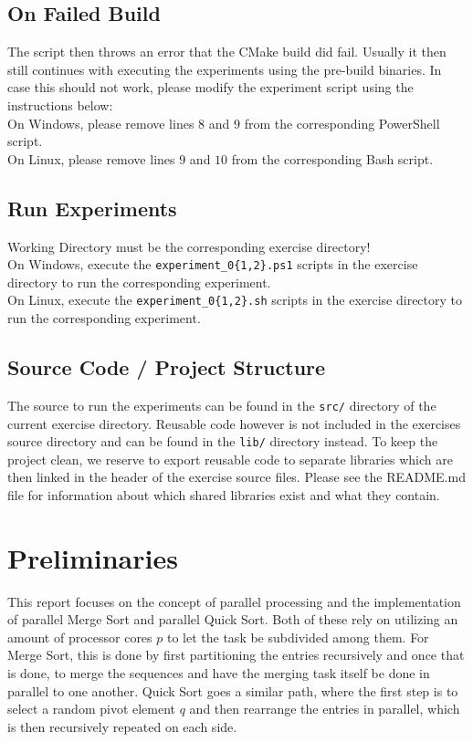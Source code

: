 \documentclass[twocolumn]{article}
\begin{document}
\subsection{On Failed Build}
The script then throws an error that the CMake build did fail.
Usually it then still continues with executing the experiments using the pre-build binaries.
In case this should not work, please modify the experiment script using the instructions below:\\
On Windows, please remove lines $8$ and $9$ from the corresponding PowerShell script.\\
On Linux, please remove lines $9$ and $10$ from the corresponding Bash script.

\subsection{Run Experiments}
Working Directory must be the corresponding exercise directory!\\
On Windows, execute the \texttt{experiment\_0\{1,2\}.ps1} scripts in the exercise directory to run the corresponding experiment.\\
On Linux, execute the \texttt{experiment\_0\{1,2\}.sh} scripts in the exercise directory to run the corresponding experiment.\\

\subsection{Source Code / Project Structure}
The source to run the experiments can be found in the \texttt{src/} directory of the current exercise directory. 
Reusable code however is not included in the exercises source directory and can be found in the \texttt{lib/} directory instead. 
To keep the project clean, we reserve to export reusable code to separate libraries which are then linked in the header of the exercise source files. 
Please see the README.md file for information about which shared libraries exist and what they contain.

\section{Preliminaries}
This report focuses on the concept of parallel processing and the implementation of parallel Merge Sort and parallel Quick Sort. Both of these rely on utilizing an amount of processor cores $p$ to let the task be subdivided among them.
For Merge Sort, this is done by first partitioning the entries recursively and once that is done, to merge the sequences and have the merging task itself be done in parallel to one another.
Quick Sort goes a similar path, where the first step is to select a random pivot element $q$ and then rearrange the entries in parallel, which is then recursively repeated on each side.
\end{document}
